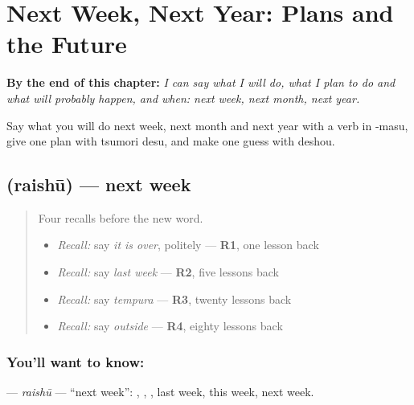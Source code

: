 
\chapter{Next Week, Next Year: Plans and the Future}
\label{ch:ja-next-week-next-year-plans-and-the-future}

\begin{chapteropening}
\textbf{By the end of this chapter:} \emph{I can say what I will do, what I plan to do and what will probably happen, and when: next week, next month, next year.}

Say what you will do next week, next month and next year with a verb in -masu, give one plan with tsumori desu, and make one guess with deshou.
\end{chapteropening}

\section[\texorpdfstring{\ja{らいしゅう} (raishū)}{らいしゅう (raishū)}]{ (raishū) — next week}

\label{lesson:JA-C141-raishuu}



\begin{quote}
Four recalls before the new word.

\begin{itemize}
\raggedright
  \item \emph{Recall:} say \emph{it is over}, politely — \textbf{R1}, one lesson back
  \item \emph{Recall:} say \emph{last week} — \textbf{R2}, five lessons back
  \item \emph{Recall:} say \emph{tempura} — \textbf{R3}, twenty lessons back
  \item \emph{Recall:} say \emph{outside} — \textbf{R4}, eighty lessons back
\end{itemize}
\end{quote}

\subsection*{You'll want to know: }
\textbf{} — \emph{raishū} — \textquotedblleft{}next week\textquotedblright{}: \textbf{}, \textbf{}, \textbf{}, last week, this week, next week.

